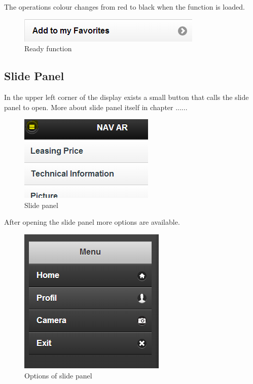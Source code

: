 The operations colour changes from red to black when the function is loaded.
\\
\begin{figure}[h]
\centering
\includegraphics[width=0.6\linewidth]{graphics/chapter4/12}
\caption{Ready function}
\label{fig:13}
\end{figure}


\subsection{Slide Panel}
In the upper left corner of the display exists a small button that calls the slide panel to open. More about slide panel itself in chapter ......
\\

\begin{figure}[h]
\centering
\includegraphics[width=0.4\linewidth]{graphics/chapter4/13}
\caption{Slide panel}
\label{fig:14}
\end{figure}

After opening the slide panel more options are available. 
\\

\begin{figure}[h]
\centering
\includegraphics[width=0.4\linewidth]{graphics/chapter4/14}
\caption{Options of slide panel}
\label{fig:15}
\end{figure}
\newpage

